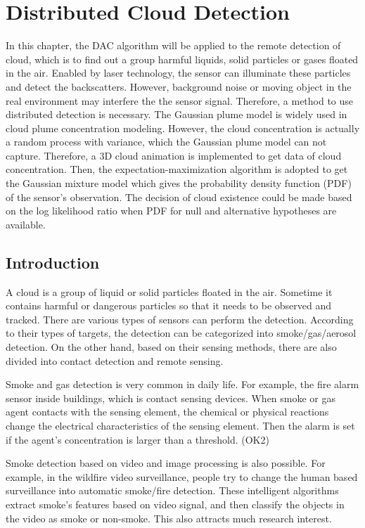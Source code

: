 
\chapter{\label{sec:DAC-Implementation:-Distributed} Distributed Cloud Detection }

In this chapter, the DAC algorithm will be applied to the remote detection
of cloud, which is to find out a group harmful liquids, solid particles
or gases floated in the air. Enabled by laser technology, the sensor
can illuminate these particles and detect the backscatters. However,
background noise or moving object in the real environment may interfere
the the sensor signal. Therefore, a method to use distributed detection
is necessary. The Gaussian plume model is widely used in cloud plume
concentration modeling. However, the cloud concentration is actually
a random process with variance, which the Gaussian plume model can
not capture. Therefore, a 3D cloud animation is implemented to get
data of cloud concentration. Then, the expectation-maximization algorithm
is adopted to get the Gaussian mixture model which gives the probability
density function (PDF) of the sensor\textquoteright{}s observation.
The decision of cloud existence could be made based on the log likelihood
ratio when PDF for null and alternative hypotheses are available. 


\section{Introduction }

A cloud is a group of liquid or solid particles floated in the air.
Sometime it contains harmful or dangerous particles so that it needs
to be observed and tracked. There are various types of sensors can
perform the detection. According to their types of targets, the detection
can be categorized into smoke/gas/aerosol detection. On the other
hand, based on their sensing methods, there are also divided into
contact detection and remote sensing. 

Smoke and gas detection is very common in daily life. For example,
the fire alarm sensor inside buildings, which is contact sensing devices.
When smoke or gas agent contacts with the sensing element, the chemical
or physical reactions change the electrical characteristics of the
sensing element. Then the alarm is set if the agent's concentration
is larger than a threshold. (OK2)

Smoke detection based on video and image processing is also possible.
For example, in the wildfire video surveillance, people try to change
the human based surveillance into automatic smoke/fire detection.
These intelligent algorithms extract smoke's features based on video
signal, and then classify the objects in the video as smoke or non-smoke.
This also attracts much research interest. 


